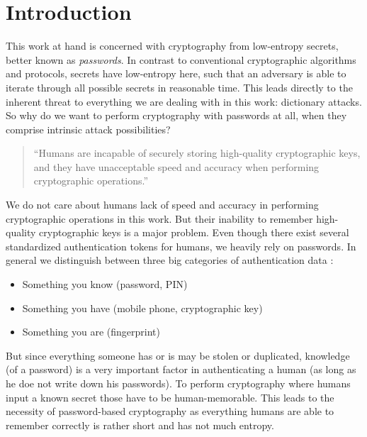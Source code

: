 \chapter{Introduction}\label{ch:introduction}

This work at hand is concerned with cryptography from low-entropy secrets, better known as \emph{passwords}.
In contrast to conventional cryptographic algorithms and protocols, secrets have low-entropy here, such that an adversary is able to iterate through all possible secrets in reasonable time.
This leads directly to the inherent threat to everything we are dealing with in this work: dictionary attacks.
So why do we want to perform cryptography with passwords at all, when they comprise intrinsic attack possibilities?

\begin{quote}
``Humans are incapable of securely storing high-quality cryptographic keys, and they have unacceptable speed and accuracy when performing cryptographic operations.''~\cite{Kaufmann02}
\end{quote}

\noindent
We do not care about humans lack of speed and accuracy in performing cryptographic operations in this work.
But their inability to remember high-quality cryptographic keys is a major problem.
Even though there exist several standardized authentication tokens for humans, we heavily rely on passwords.
In general we distinguish between three big categories of authentication data \cite{Burr11}:
\begin{itemize}
	\item Something you know (\eg password, \ac{PIN})
	\item Something you have (\eg mobile phone, cryptographic key)
	\item Something you are (\eg fingerprint)
\end{itemize}
But since everything someone has or is may be stolen or duplicated, knowledge (of a password) is a very important factor in authenticating a human (as long as he doe not write down his passwords).
To perform cryptography where humans input a known secret those have to be human-memorable.
This leads to the necessity of password-based cryptography as everything humans are able to remember correctly is rather short and has not much entropy.

